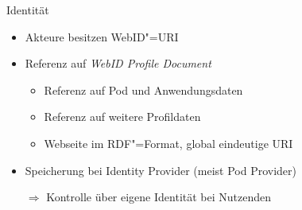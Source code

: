 \begin{frame}{Identität}
    \begin{itemize}
        \item Akteure besitzen WebID"=URI~\cite{sambraSolidPlatformDecentralized2016}
        
        \item Referenz auf \emph{WebID Profile Document}~\cite{sambraSolidPlatformDecentralized2016,solidcommunitygroupSolidemblemsvg2019}
        \pause
        \begin{itemize}
            \item Referenz auf Pod und Anwendungsdaten~\cite{solidcommunitygroupSolidWebIDProfile2024}
            \item Referenz auf weitere Profildaten~\cite{solidcommunitygroupSolidWebIDProfile2024}
            \item Webseite im RDF"=Format, global eindeutige URI~\cite{sambraSolidPlatformDecentralized2016}
        \end{itemize}
        
        \pause
        \item Speicherung bei Identity Provider (meist Pod Provider)~\cite{sambraSolidPlatformDecentralized2016}
        \item[$\Rightarrow$] Kontrolle über eigene Identität bei Nutzenden~\cite{sambraSolidPlatformDecentralized2016}
    \end{itemize}
\end{frame}



